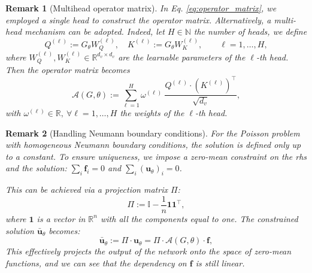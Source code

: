 \documentclass{article}
\newcommand{\R}{\mathbb{R}}
\newcommand{\N}{\mathbb{N}}
\theoremstyle{plain}
\newtheorem{rmk}{Remark}
\numberwithin{equation}{section}
\begin{document}
\begin{rmk}[Multihead operator matrix]
    In Eq. \eqref{eq:operator_matrix}, we employed a single head to construct the operator matrix. Alternatively, a multi-head mechanism can be adopted. Indeed, let $H\in \N$ the number of heads, we define
    \[ Q^{(\ell)} := G_{\theta} W_{Q}^{(\ell)}, \quad K^{(\ell)} := G_{\theta} W_{K}^{(\ell)}, \qquad \ell = 1, \ldots, H, \]
    where $W_{Q}^{(\ell)}, W_{K}^{(\ell)} \in \R^{d_v \times d_v}$ are the learnable parameters of the $\ell$-th head. Then the operator matrix becomes
    \begin{equation}
        \mathcal{A}(G, \theta) := \sum_{\ell=1}^H  \omega^{(\ell)}\ \frac{Q^{(\ell)} \cdot \left(K^{(\ell)}\right)^\top}{\sqrt{d_v}},
        \label{eq:A_multihead}
    \end{equation}
    with $\omega^{(\ell)} \in \R, \ \forall \ell = 1, \ldots, H$ the weights of the $\ell$-th head.
\end{rmk}

\begin{rmk}[Handling Neumann boundary conditions]
    For the   Poisson problem with homogeneous Neumann boundary conditions, the solution is defined only up to a constant. To ensure uniqueness, we impose a zero-mean constraint on the rhs and the solution: $\sum_i \mathbf{f}_i = 0$ and $\sum_i (\mathbf{u}_\theta)_i = 0$.

    This can be achieved via a projection matrix $\Pi$:
    \begin{equation*}
        \Pi := \mathbb{I} - \frac{1}{n} \mathbf{1}\mathbf{1}^\top,
    \end{equation*}
    where $\mathbf{1}$ is a vector in $\mathbb{R}^n$ with all the components equal to one. The constrained solution $\bar{\mathbf{u}}_\theta$ becomes:
    \begin{equation*}
        \bar{\mathbf{u}}_\theta := \Pi \cdot \mathbf{u}_\theta = \Pi \cdot \mathcal{A}(G, \theta) \cdot \mathbf{f},
    \end{equation*}
    This effectively projects the output of the network onto the space of zero-mean functions, and we can see that the dependency on $\mathbf{f}$ is still linear.
\end{rmk}
\end{document}
